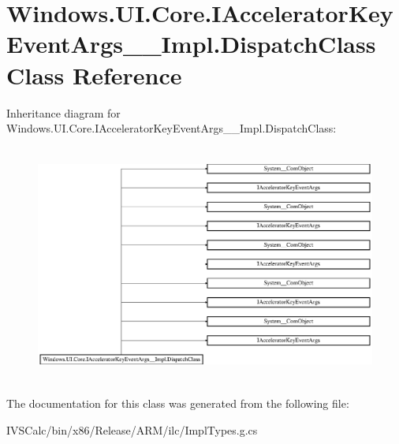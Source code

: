 \hypertarget{class_windows_1_1_u_i_1_1_core_1_1_i_accelerator_key_event_args_____impl_1_1_dispatch_class}{}\section{Windows.\+U\+I.\+Core.\+I\+Accelerator\+Key\+Event\+Args\+\_\+\+\_\+\+Impl.\+Dispatch\+Class Class Reference}
\label{class_windows_1_1_u_i_1_1_core_1_1_i_accelerator_key_event_args_____impl_1_1_dispatch_class}
Inheritance diagram for Windows.\+U\+I.\+Core.\+I\+Accelerator\+Key\+Event\+Args\+\_\+\+\_\+\+Impl.\+Dispatch\+Class\+:\begin{figure}[H]
\begin{center}
\leavevmode
\includegraphics[height=7.857142cm]{class_windows_1_1_u_i_1_1_core_1_1_i_accelerator_key_event_args_____impl_1_1_dispatch_class}
\end{center}
\end{figure}


The documentation for this class was generated from the following file\+:\begin{DoxyCompactItemize}
\item 
I\+V\+S\+Calc/bin/x86/\+Release/\+A\+R\+M/ilc/Impl\+Types.\+g.\+cs\end{DoxyCompactItemize}

